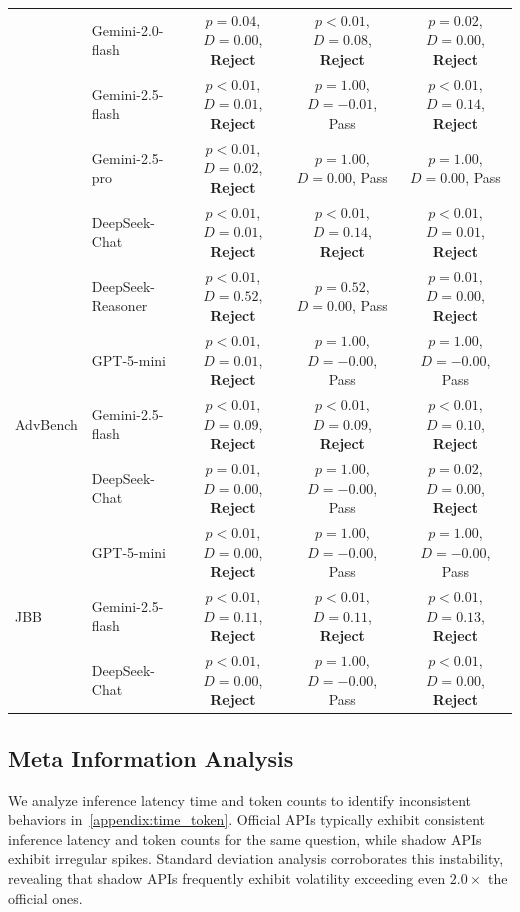 \documentclass[letterpaper,twocolumn,10pt]{article}
\begin{document}
\begin{table}[t!]
{\begin{tabular}{llccc}
 & Gemini-2.0-flash & $p{=}0.04$, $D{=}0.00$, \textbf{Reject} & $p{<}0.01$, $D{=}0.08$, \textbf{Reject} & $p{=}0.02$, $D{=}0.00$, \textbf{Reject} \\
 & Gemini-2.5-flash & $p{<}0.01$, $D{=}0.01$, \textbf{Reject} & $p{=}1.00$, $D{=}{-}0.01$, Pass & $p{<}0.01$, $D{=}0.14$, \textbf{Reject} \\
 & Gemini-2.5-pro   & $p{<}0.01$, $D{=}0.02$, \textbf{Reject} & $p{=}1.00$, $D{=}0.00$, Pass & $p{=}1.00$, $D{=}0.00$, Pass \\
 & DeepSeek-Chat    & $p{<}0.01$, $D{=}0.01$, \textbf{Reject} & $p{<}0.01$, $D{=}0.14$, \textbf{Reject} & $p{<}0.01$, $D{=}0.01$, \textbf{Reject} \\
 & DeepSeek-Reasoner& $p{<}0.01$, $D{=}0.52$, \textbf{Reject} & $p{=}0.52$, $D{=}0.00$, Pass & $p{=}0.01$, $D{=}0.00$, \textbf{Reject} \\
\midrule
\multirow{3}{*}{AdvBench}
 & GPT-5-mini        & $p{<}0.01$, $D{=}0.01$, \textbf{Reject} & $p{=}1.00$, $D{=}{-}0.00$, Pass & $p{=}1.00$, $D{=}{-}0.00$, Pass \\
 & Gemini-2.5-flash  & $p{<}0.01$, $D{=}0.09$, \textbf{Reject} & $p{<}0.01$, $D{=}0.09$, \textbf{Reject} & $p{<}0.01$, $D{=}0.10$, \textbf{Reject} \\
 & DeepSeek-Chat& $p{=}0.01$, $D{=}0.00$, \textbf{Reject} & $p{=}1.00$, $D{=}{-}0.00$, Pass & $p{=}0.02$, $D{=}0.00$, \textbf{Reject} \\
\midrule
\multirow{3}{*}{JBB}
 & GPT-5-mini        & $p{<}0.01$, $D{=}0.00$, \textbf{Reject} & $p{=}1.00$, $D{=}{-}0.00$, Pass & $p{=}1.00$, $D{=}{-}0.00$, Pass \\
 & Gemini-2.5-flash  & $p{<}0.01$, $D{=}0.11$, \textbf{Reject} & $p{<}0.01$, $D{=}0.11$, \textbf{Reject} & $p{<}0.01$, $D{=}0.13$, \textbf{Reject} \\
 & DeepSeek-Chat& $p{<}0.01$, $D{=}0.00$, \textbf{Reject} & $p{=}1.00$, $D{=}{-}0.00$, Pass & $p{<}0.01$, $D{=}0.00$, \textbf{Reject} \\
\bottomrule
\end{tabular}}
\end{table}

\subsection{Meta Information Analysis}
We analyze inference latency time and token counts to identify inconsistent behaviors in~\autoref{appendix:time_token}.
Official APIs typically exhibit consistent inference latency and token counts for the same question, while shadow APIs exhibit irregular spikes.
Standard deviation analysis corroborates this instability, revealing that shadow APIs frequently exhibit volatility exceeding even $2.0\times$ the official ones.
\end{document}
